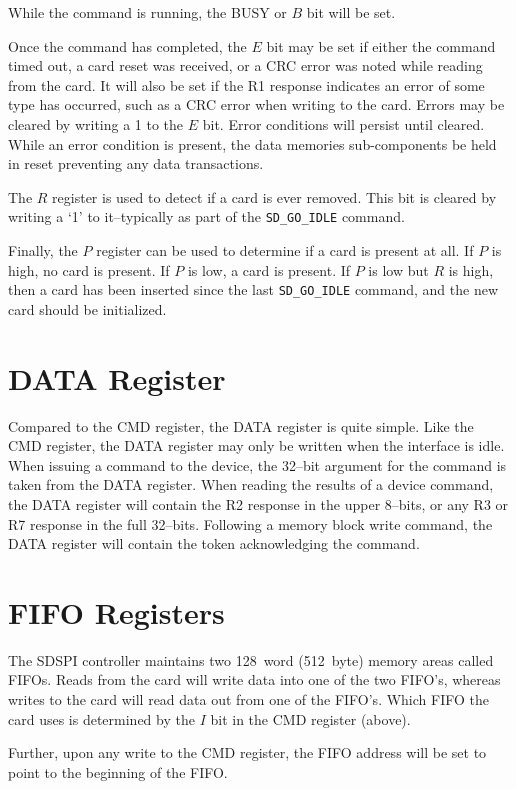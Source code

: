 \documentclass{gqtekspec}
\begin{document}
While the command is running, the BUSY or $B$ bit will be set.

Once the command has completed, the $E$ bit may be set if either the command 
timed out, a card reset was received, or a CRC error was noted while reading
from the card.  It will also be set if the R1 response indicates an error
of some type has occurred, such as a CRC error when writing to the card.
Errors may be cleared by writing a 1 to the $E$ bit.
Error conditions will persist until cleared.  While an error condition is
present, the data memories sub-components be held in reset preventing any
data transactions.

The $R$ register is used to detect if a card is ever removed.  This bit is
cleared by writing a `1' to it--typically as part of the {\tt SD\_GO\_IDLE}
command.

Finally, the $P$ register can be used to determine if a card is present at all.
If $P$ is high, no card is present.  If $P$ is low, a card is present.  If
$P$ is low but $R$ is high, then a card has been inserted since the last
{\tt SD\_GO\_IDLE} command, and the new card should be initialized.

\section{DATA Register}
Compared to the CMD register, the DATA register is quite simple.  Like the
CMD register, the DATA register may only be written when the interface is
idle.  When issuing a command to the device, the 32--bit argument for the
command is taken from the DATA register.  When reading the results of a device
command, the DATA register will contain the R2 response in the upper 8--bits,
or any R3 or R7 response in the full 32--bits.  Following a memory block write
command, the DATA register will contain the token acknowledging the command.

\section{FIFO Registers}
The SDSPI controller maintains two 128~word (512~byte) memory areas called
FIFOs.  Reads from the card will write data into one of the two FIFO's, whereas
writes to the card will read data out from one of the FIFO's.  Which FIFO the
card uses is determined by the $I$ bit in the CMD register (above).

Further, upon any write to the CMD register, the FIFO address will be set
to point to the beginning of the FIFO.
\end{document}
